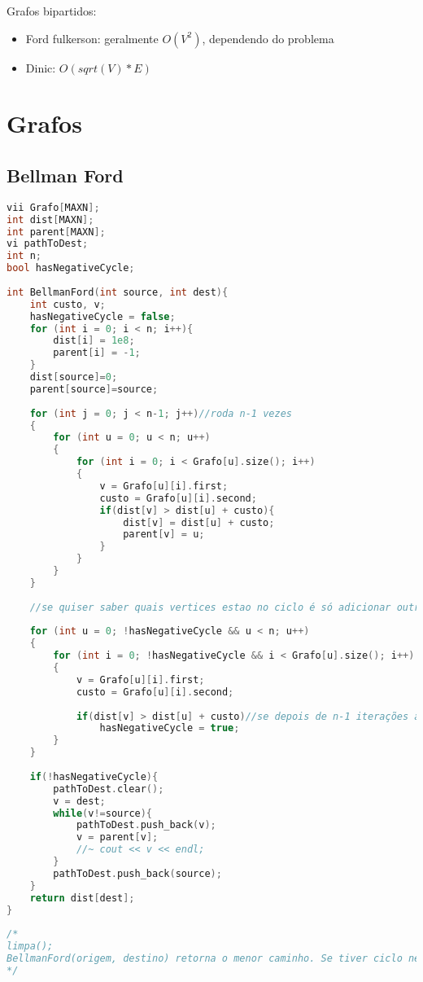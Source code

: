 \documentclass[12pt,a4paper,twoside]{report}
\begin{document}
Grafos bipartidos:
\begin{itemize}
  \item Ford fulkerson: geralmente $O(V^2)$, dependendo do problema
  \item Dinic: $O(sqrt(V)*E)$
\end{itemize}


\chapter{Grafos}

\section{Bellman Ford}
\noindent\begin{lstlisting}[caption=Bellman Ford,language=C++]
vii Grafo[MAXN];
int dist[MAXN];
int parent[MAXN];
vi pathToDest;
int n;
bool hasNegativeCycle;
 
int BellmanFord(int source, int dest){
    int custo, v;
    hasNegativeCycle = false;
    for (int i = 0; i < n; i++){
        dist[i] = 1e8;
        parent[i] = -1;
    }
    dist[source]=0;
    parent[source]=source;
     
    for (int j = 0; j < n-1; j++)//roda n-1 vezes
    {
        for (int u = 0; u < n; u++)
        {
            for (int i = 0; i < Grafo[u].size(); i++)
            {
                v = Grafo[u][i].first;
                custo = Grafo[u][i].second;
                if(dist[v] > dist[u] + custo){
                    dist[v] = dist[u] + custo;
                    parent[v] = u;
                }
            }         
        }     
    }
     
    //se quiser saber quais vertices estao no ciclo é só adicionar outr for de 0 até 5, por exemplo, e ver qual distancia diminuiu. Se rodar só uma vez dependendo da configuração das aresta pode ser que não ache todos do ciclo, por isso é melhor rodar uma quantidade X de vezes, o ideal seria X = n
    
    for (int u = 0; !hasNegativeCycle && u < n; u++)
    {
        for (int i = 0; !hasNegativeCycle && i < Grafo[u].size(); i++)
        {
            v = Grafo[u][i].first;
            custo = Grafo[u][i].second;
             
            if(dist[v] > dist[u] + custo)//se depois de n-1 iterações ainda existe um caminho menor, existe um ciclo negativo
                hasNegativeCycle = true;          
        }     
    }
     
    if(!hasNegativeCycle){
        pathToDest.clear();
        v = dest;
        while(v!=source){
            pathToDest.push_back(v);
            v = parent[v];
            //~ cout << v << endl;
        }
        pathToDest.push_back(source);
    }
    return dist[dest];
}
 
/*
limpa();
BellmanFord(origem, destino) retorna o menor caminho. Se tiver ciclo negativo a variável hasNegativeCycle vai ser true.
*/
\end{lstlisting}
\end{document}
